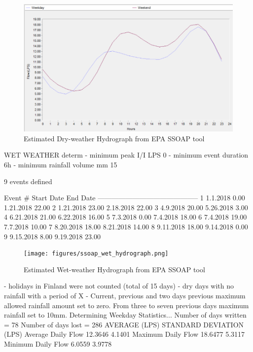 \begin{figure}[ht]
    \centering
	\includegraphics[scale=0.6]{figures/ssoap_dry_hydrograph.png}
	\caption{Estimated Dry-weather Hydrograph from EPA SSOAP tool}
	\label{fig:ssoapdryh}
\end{figure}
    
    
WET WEATHER determ
- minimum peak I/I LPS 0 
- minimum event duration 6h
- minimum rainfall volume mm 15


9 events defined

Event #        Start Date           End Date
--------------------------------------------
1          1.1.2018 0.00    1.21.2018 22.00
2        1.21.2018 23.00    2.18.2018 22.00
3         4.9.2018 20.00     5.26.2018 3.00
4        6.21.2018 21.00    6.22.2018 16.00
5          7.3.2018 0.00     7.4.2018 18.00
6         7.4.2018 19.00     7.7.2018 10.00
7        8.20.2018 18.00    8.21.2018 14.00
8        9.11.2018 18.00     9.14.2018 0.00
9         9.15.2018 8.00    9.19.2018 23.00



\begin{figure}[ht]
    \centering
	\texttt{[image: figures/ssoap\_wet\_hydrograph.png]}
	\caption{Estimated Wet-weather Hydrograph from EPA SSOAP tool}
	\label{fig:ssoapweth}
\end{figure}    

- holidays in Finland were not counted (total of 15 days)
- dry days with no rainfall with a period of X
- Current, previous and two days previous maximum allowed rainfall amount set to zero. From three to seven previous days maximum rainfall set to 10mm.
Determining Weekday Statistics...
 Number of days written = 78
 Number of days lost    = 286
                      AVERAGE (LPS)   STANDARD DEVIATION (LPS)
Average Daily Flow      12.3646                  4.1401
Maximum Daily Flow      18.6477                  5.3117
Minimum Daily Flow      6.0559                  3.9778

